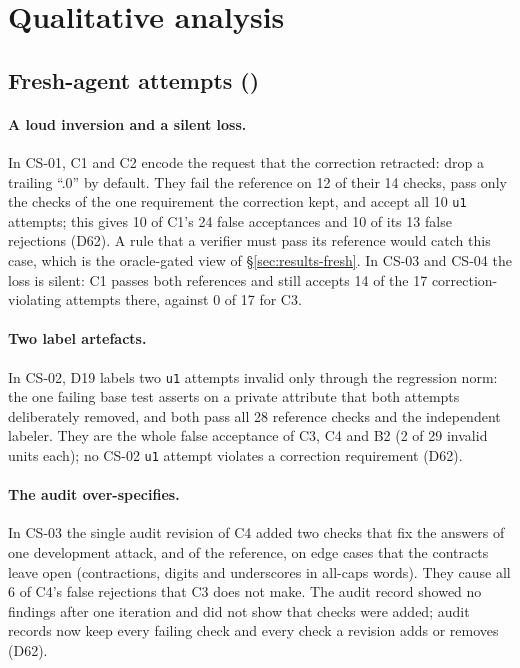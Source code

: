 \section{Qualitative analysis}
\label{sec:analysis}
\subsection{Fresh-agent attempts (\texttt{\FRESHRUN})}
\label{sec:analysis-fresh}
\paragraph{A loud inversion and a silent loss.} In CS-01, C1 and C2 encode the request that the correction retracted: drop a trailing ``.0'' by default. They fail the reference on 12 of their 14 checks, pass only the checks of the one requirement the correction kept, and accept all 10 \texttt{u1} attempts; this gives 10 of C1's 24 false acceptances and 10 of its 13 false rejections (D62). A rule that a verifier must pass its reference would catch this case, which is the oracle-gated view of \S\ref{sec:results-fresh}. In CS-03 and CS-04 the loss is silent: C1 passes both references and still accepts 14 of the 17 correction-violating attempts there, against 0 of 17 for C3.

\paragraph{Two label artefacts.} In CS-02, D19 labels two \texttt{u1} attempts invalid only through the regression norm: the one failing base test asserts on a private attribute that both attempts deliberately removed, and both pass all 28 reference checks and the independent labeler. They are the whole false acceptance of C3, C4 and B2 (2 of 29 invalid units each); no CS-02 \texttt{u1} attempt violates a correction requirement (D62).

\paragraph{The audit over-specifies.} In CS-03 the single audit revision of C4 added two checks that fix the answers of one development attack, and of the reference, on edge cases that the contracts leave open (contractions, digits and underscores in all-caps words). They cause all 6 of C4's false rejections that C3 does not make. The audit record showed no findings after one iteration and did not show that checks were added; audit records now keep every failing check and every check a revision adds or removes (D62).

